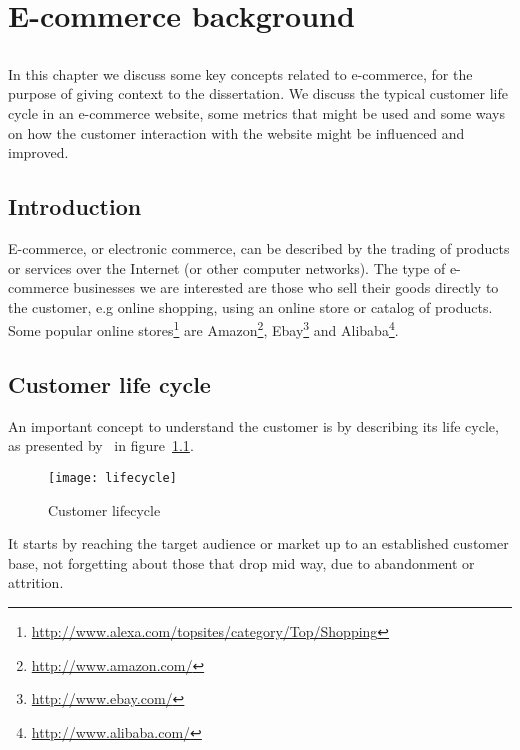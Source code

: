 \chapter{E-commerce background} \label{chap:ecommerce}

\section*{}

In this chapter we discuss some key concepts related to e-commerce, for the 
purpose of giving context to the dissertation. We discuss the typical customer 
life cycle in an e-commerce website, some metrics that might be used and some 
ways on how the customer interaction with the website might be influenced and 
improved.

\section{Introduction}

E-commerce, or electronic commerce, can be described by the trading of products 
or services over the Internet (or other computer networks). The type of 
e-commerce businesses we are interested are those who sell their goods directly 
to the customer, e.g online shopping, using an online store or catalog of 
products. Some popular online 
stores\footnote{\url{http://www.alexa.com/topsites/category/Top/Shopping}} are 
Amazon\footnote{\url{http://www.amazon.com/}}, 
Ebay\footnote{\url{http://www.ebay.com/}} and 
Alibaba\footnote{\url{http://www.alibaba.com/}}.

\section{Customer life cycle}

An important concept to understand the customer is by describing its life 
cycle, as presented by~\cite[Section 6]{Sterne2000} in 
figure~\ref{fig:lifecycle}.

\begin{figure}[h]
  \begin{center}
    \leavevmode
    \texttt{[image: lifecycle]}
    \caption{Customer lifecycle \cite{Sterne2000}}
    \label{fig:lifecycle}
  \end{center}
\end{figure}

It starts by reaching the target audience or market up to an established 
customer base, not forgetting about those that drop mid way, due to abandonment 
or attrition.

